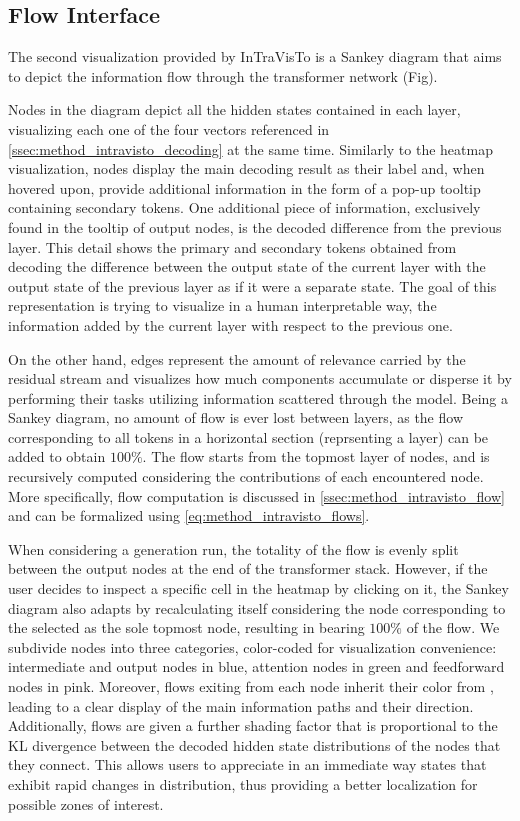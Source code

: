 \subsection{Flow Interface}\label{sec:exp_intravisto_exp2}

The second visualization provided by InTraVisTo is a Sankey diagram that aims to depict the information flow through the transformer network (Fig).

Nodes in the diagram depict all the hidden states contained in each layer, visualizing each one of the four vectors referenced in \cref{ssec:method_intravisto_decoding} at the same time.
Similarly to the heatmap visualization, nodes display the main decoding result as their label and, when hovered upon, provide additional information in the form of a pop-up tooltip containing secondary tokens.
One additional piece of information, exclusively found in the tooltip of output nodes, is the decoded difference from the previous layer.
This detail shows the primary and secondary tokens obtained from decoding the difference between the output state of the current layer with the output state of the previous layer as if it were a separate state.
The goal of this representation is trying to visualize in a human interpretable way, the information added by the current layer with respect to the previous one.

On the other hand, edges represent the amount of relevance carried by the residual stream and visualizes how much components accumulate or disperse it by performing their tasks utilizing information scattered through the model.
Being a Sankey diagram, no amount of flow is ever lost between layers, as the flow corresponding to all tokens in a horizontal section (reprsenting a layer) can be added to obtain $100\%$.
The flow starts from the topmost layer of nodes, and is recursively computed considering the contributions of each encountered node.
More specifically, flow computation is discussed  in \cref{ssec:method_intravisto_flow} and can be formalized using \cref{eq:method_intravisto_flows}.

When considering a  generation run, the totality of the flow is evenly split between the output nodes at the end of the transformer stack.
However, if the user decides to inspect a specific cell in the heatmap by clicking on it, the Sankey diagram also adapts by recalculating itself considering the node corresponding to the selected as the sole topmost node, resulting in  bearing $100\%$ of the flow.
We subdivide nodes into three categories, color-coded for visualization convenience: intermediate and output nodes in blue, attention nodes in green and feedforward nodes in pink.
Moreover, flows exiting from each node inherit their color from , leading to a clear display of the main information paths and their direction.
Additionally, flows are given a further shading factor that is proportional to the KL divergence between the decoded hidden state distributions of the nodes that they connect.
This allows users to appreciate in an immediate way states that exhibit rapid changes in distribution, thus providing a better localization for possible zones of interest.

